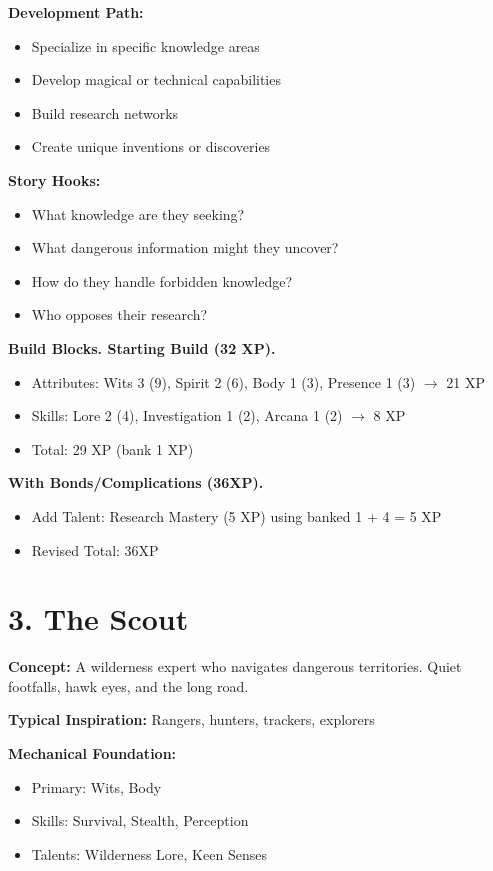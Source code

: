 \documentclass[11pt,twoside,openany]{book}
\begin{document}
\textbf{Development Path:}
\begin{itemize}
\item Specialize in specific knowledge areas
\item Develop magical or technical capabilities
\item Build research networks
\item Create unique inventions or discoveries
\end{itemize}

\textbf{Story Hooks:}
\begin{itemize}
\item What knowledge are they seeking?
\item What dangerous information might they uncover?
\item How do they handle forbidden knowledge?
\item Who opposes their research?
\end{itemize}

\textbf{Build Blocks. Starting Build (32 XP).}
\begin{itemize}
\item Attributes: Wits 3 (9), Spirit 2 (6), Body 1 (3), Presence 1 (3) $\rightarrow$ 21 XP
\item Skills: Lore 2 (4), Investigation 1 (2), Arcana 1 (2) $\rightarrow$ 8 XP
\item Total: 29 XP (bank 1 XP)
\end{itemize}

\textbf{With Bonds/Complications (36XP).}
\begin{itemize}
\item Add Talent: Research Mastery (5 XP) using banked 1 + 4 = 5 XP
\item Revised Total: 36XP
\end{itemize}

\section*{3. The Scout} 

\textbf{Concept:} A wilderness expert who navigates dangerous territories. Quiet footfalls, hawk eyes, and the long road.

\textbf{Typical Inspiration:} Rangers, hunters, trackers, explorers

\textbf{Mechanical Foundation:}
\begin{itemize}
\item Primary: Wits, Body
\item Skills: Survival, Stealth, Perception
\item Talents: Wilderness Lore, Keen Senses
\end{itemize}
\end{document}
